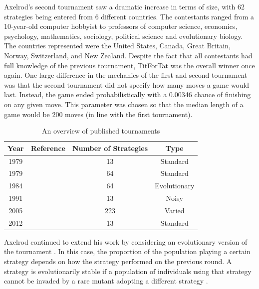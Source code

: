 Axelrod's second tournament \cite{Axelrod1980b} saw a dramatic increase in terms of size, with 62 strategies being entered from 6 different countries.
The contestants ranged from a 10-year-old computer hobbyist to professors of computer science, economics, psychology, mathematics, sociology, political science and evolutionary biology.
The countries represented were the United States, Canada, Great Britain, Norway, Switzerland, and New Zealand.
Despite the fact that all contestants had full knowledge of the previous tournament, TitForTat was the overall winner once again.
One large difference in the mechanics of the first and second tournament was that the second tournament did not specify how many moves a game would last.
Instead, the game ended probabilistically with a 0.00346 chance of finishing on any given move.
This parameter was chosen so that the median length of a game would be 200 moves (in line with the first tournament).

\begin{table}[htbp]
    \centering
    \begin{tabular}{c c c c}
        \toprule
        Year & Reference & Number of Strategies & Type\\
        \midrule
        1979 & \cite{Axelrod1980a} & 13 & Standard\\
        1979 & \cite{Axelrod1980b} & 64 & Standard\\
        1984 & \cite{Axelrod1981} & 64 & Evolutionary\\
        1991 & \cite{Bendor1991} & 13 & Noisy\\
        2005 & \cite{Chong2004} & 223 & Varied\\
        2012 & \cite{Stewart2012} & 13 & Standard\\
        \bottomrule
    \end{tabular}
    \label{tab:tournament_refs}
    \caption{An overview of published tournaments}
\end{table}

Axelrod continued to extend his work by considering an evolutionary version of the tournament \cite{Axelrod1981, Axelrod1984}.
In this case, the proportion of the population playing a certain strategy depends on how the strategy performed on the previous round.
A strategy is evolutionarily stable if a population of individuals using that strategy cannot be invaded by a rare mutant adopting a different strategy \cite{Axelrod1981}.

